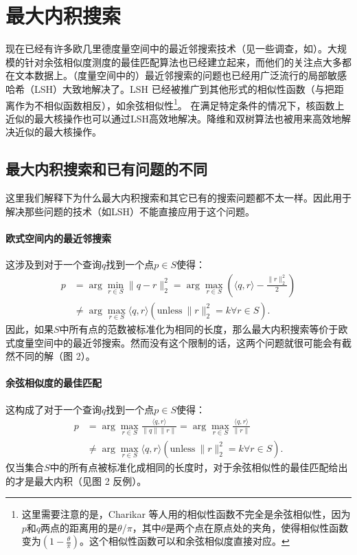\documentclass[twocolumn,a4paper]{article}
\begin{document}
\section{最大内积搜索}
现在已经有许多欧几里德度量空间中的最近邻搜索技术（见一些调查，如\cite{9}）。大规模的针对余弦相似度测度\cite{1}的最佳匹配算法也已经建立起来，而他们的关注点大多都在文本数据上。（度量空间中的）最近邻搜索的问题也已经用广泛流行的局部敏感哈希（LSH）\cite{14,18}大致地解决了。LSH 已经被推广到其他形式的相似性函数（与把距离作为不相似函数相反），如余弦相似性\cite{7}\footnote{这里需要注意的是，Charikar 等人\cite{7}用的相似性函数不完全是余弦相似性，因为$p$和$q$两点的距离用的是$\theta$/$\pi$，其中$\theta$是两个点在原点处的夹角，使得相似性函数变为$\left(1-\frac{\theta}{\pi}\right)$。这个相似性函数可以和余弦相似度直接对应。}。
在满足特定条件的情况下，核函数上近似的最大核操作也可以通过LSH高效地解决。降维\cite{30}和双树算法\cite{20}也被用来高效地解决近似的最大核操作。

\subsection{最大内积搜索和已有问题的不同}
这里我们解释下为什么最大内积搜索和其它已有的搜索问题都不太一样。因此用于解决那些问题的技术（如LSH）不能直接应用于这个问题。

\paragraph{欧式空间内的最近邻搜索}这涉及到对于一个查询$q$找到一个点$p \in S$使得：
\begin{align*}
p &= \arg \min_{r \in S}\|q - r\|^2_2 = \arg \max_{r \in S}\left(\langle q,r \rangle - \frac{\|r\|_2^2}{2}\right) \\
  &  \neq \arg \max_{r \in S} \langle q,r \rangle (\mathrm{unless}\ \|r\|_2^2 = k \forall r \in S).
\end{align*}
因此，如果$S$中所有点的范数被标准化为相同的长度，那么最大内积搜索等价于欧式度量空间中的最近邻搜索。然而没有这个限制的话，这两个问题就很可能会有截然不同的解（图 2）。

\paragraph{余弦相似度的最佳匹配}这构成了对于一个查询$q$找到一个点$p \in S$使得：
\begin{align*}
p &= \arg \max_{r \in S} \frac{\langle q,r \rangle}{\|q\|\|r\|} = \arg \max_{r \in S} \frac{\langle q,r \rangle}{\|r\|} \\
    &\neq \arg \max_{r \in S} \langle q,r \rangle (\mathrm{unless}\ \|r\|_2^2 = k \forall r \in S).
\end{align*}
仅当集合$S$中的所有点被标准化成相同的长度时，对于余弦相似性的最佳匹配给出的才是最大内积（见图 2 反例）。
\end{document}
